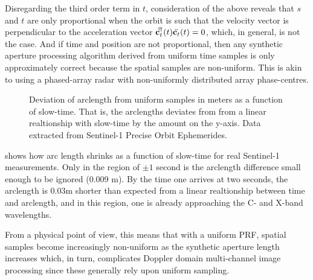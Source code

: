 Disregarding the third order term in $t$, consideration of the above reveals that $s$ and $t$ are only proportional when the orbit is such that the velocity vector is perpendicular to the acceleration vector $\hat{\dot{\mathbf{c}_t}}^\dagger(t)\ddot{\mathbf{c}_t}(t)=0$, which, in general, is not the case. And if time and position are not proportional, then any synthetic aperture processing algorithm derived from uniform time samples is only approximately correct because the spatial samples are non-uniform. This is akin to using a phased-array radar with non-uniformly distributed array phase-centres.
\begin{figure}
    \resizebox{\textwidth}{!}{}
	\caption{Deviation of arclength from uniform samples in meters as a function of slow-time. That is, the arclengths deviates from from a linear realtionship with slow-time by the amount on the y-axis. Data extracted from Sentinel-1 Precise Orbit Ephemerides.}
	\label{fg:ARCLengthError}
\end{figure}
\par
{} shows how arc length shrinks as a function of slow-time for real Sentinel-1 measurements. Only in the region of $\pm 1$ second is the arclength difference small enough to be ignored (0.009 m). By the time one arrives at two seconds, the arclength is $0.03$m shorter than expected from a linear realtionship between time and arclength, and in this region, one is already approaching the C- and X-band wavelengths.
\par
From a physical point of view, this means that with a uniform PRF, spatial samples become increasingly non-uniform as the synthetic aperture length increases which, in turn, complicates Doppler domain multi-channel image processing since these generally rely upon uniform sampling. 
